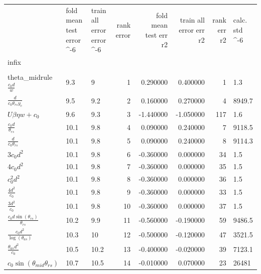 \begin{tabularx}{\textwidth}{lllrrrrl}
\toprule
  &  fold mean test error \cdot 10^-6  &  train all error error \cdot 10^-6  &  rank error  &  fold mean test err r2  &  train all error err r2  &  rank err r2  &  calc. std \cdot 10^-6  \\ 
infix  &    &    &    &    &    &    &    \\ 
\\theta_{mid}rule
$ \displaystyle\frac{c_{0} d}{w} $  &  9.3  &  9\phantom{.0}  &  1  &  0.290000  &  0.400000  &  1  &  1.3  \\ 
$ \displaystyle\frac{d}{c_{0} \theta_{rs} y_c} $  &  9.5  &  9.2  &  2  &  0.160000  &  0.270000  &  4  &  8949.7  \\ 
$ U \beta \eta w + c_{0} $  &  9.6  &  9.3  &  3  &  -1.440000  &  -1.050000  &  117  &  1.6  \\ 
$ \displaystyle\frac{c_{0} d}{\theta_{rs}} $  &  10.1  &  9.8  &  4  &  0.090000  &  0.240000  &  7  &  9118.5  \\ 
$ \displaystyle\frac{d}{c_{0} \theta_{rs}} $  &  10.1  &  9.8  &  5  &  0.090000  &  0.240000  &  8  &  9114.3  \\ 
$ 3 c_{0} d^{2} $  &  10.1  &  9.8  &  6  &  -0.360000  &  0.000000  &  34  &  1.5  \\ 
$ 4 c_{0} d^{2} $  &  10.1  &  9.8  &  7  &  -0.360000  &  0.000000  &  35  &  1.5  \\ 
$ c_{0}^{2} d^{2} $  &  10.1  &  9.8  &  8  &  -0.360000  &  0.000000  &  36  &  1.5  \\ 
$ \displaystyle\frac{4 d^{2}}{c_{0}} $  &  10.1  &  9.8  &  9  &  -0.360000  &  0.000000  &  33  &  1.5  \\ 
$ \displaystyle\frac{3 d^{2}}{c_{0}} $  &  10.1  &  9.8  &  10  &  -0.360000  &  0.000000  &  37  &  1.5  \\ 
$ \displaystyle\frac{c_{0} d \sin{\left(\theta_{rs} \right)}}{\theta_{rs}} $  &  10.2  &  9.9  &  11  &  -0.560000  &  -0.190000  &  59  &  9486.5  \\ 
$ \displaystyle\frac{c_{0} d^{2}}{\log{\left(\theta_{as} \right)}} $  &  10.3  &  10\phantom{.0}  &  12  &  -0.500000  &  -0.120000  &  47  &  3521.5  \\ 
$ \displaystyle\frac{\theta_{as} d^{2}}{c_{0}} $  &  10.5  &  10.2  &  13  &  -0.400000  &  -0.020000  &  39  &  7123.1  \\ 
$ c_{0} \sin{\left(\theta_{mid} \theta_{rs} \right)} $  &  10.7  &  10.5  &  14  &  -0.010000  &  0.070000  &  23  &  26481\phantom{.0}  \\ 

\end{tabularx}

